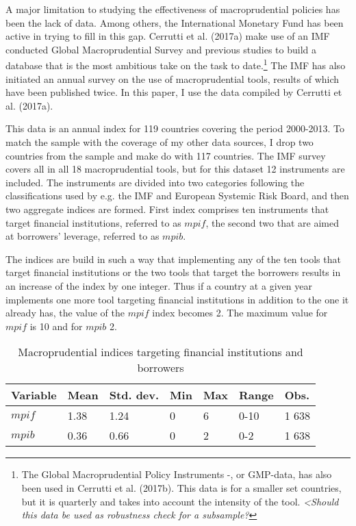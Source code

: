 \documentclass[12pt,a4paper]{article}
\begin{document}
A major limitation to studying the effectiveness of macroprudential policies has been the lack of data. Among others, the International Monetary Fund has been active in trying to fill in this gap. Cerrutti et al. (2017a) make use of an IMF conducted Global Macroprudential Survey and previous studies to build a database that is the most ambitious take on the task to date.\footnote{The Global Macroprudential Policy Instruments -, or GMP-data, has also been used in Cerrutti et al. (2017b). This data is for a smaller set countries, but it is quarterly and takes into account the intensity of the tool. \textit{<Should this data be used as robustness check for a subsample?}} The IMF has also initiated an annual survey on the use of macroprudential tools, results of which have been published twice.  In this paper, I use the data compiled by Cerrutti et al. (2017a).

This data is an annual index for 119 countries covering the period 2000-2013. To match the sample with the coverage of my other data sources, I drop two countries from the sample and make do with 117 countries. The IMF survey covers all in all 18 macroprudential tools, but for this dataset 12 instruments are included. The instruments are divided into two categories following the classifications used by e.g. the IMF and European Systemic Risk Board, and then two aggregate indices are formed. First index comprises ten instruments that target financial institutions, referred to as $mpif$, the second two that are aimed at borrowers' leverage, referred to as $mpib$. 

The indices are build in such a way that implementing any of the ten tools that target financial institutions or the two tools that target the borrowers results in an increase of the index by one integer. Thus if a country at a given year implements one more tool targeting financial institutions in addition to the one it already has, the value of the $mpif$ index becomes 2. The maximum value for $mpif$ is 10 and for $mpib$ 2. 

\begin{table}[!h]
\centering
\begin{tabular}{ l l l l l l l }
\hline
Variable&Mean&Std. dev.&Min&Max&Range&Obs. \\
\hline
$mpif$&1.38&1.24&0&6&0-10&1 638 \\
$mpib$&0.36&0.66&0&2&0-2&1 638 \\
\hline
\end{tabular}
\caption{Macroprudential indices targeting financial institutions and borrowers}
\label{tab:mpi}
\end{table}
\end{document}
